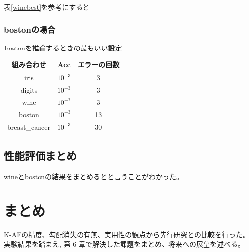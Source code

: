 表\ref{winebest}を参考にすると

\subsubsection{bostonの場合}

\begin{table}[htbp]
    \begin{center}
        \caption{bostonを推論するときの最もいい設定}
        \label{bostonbest}
        \vspace{2mm} 
        \begin{tabular}{ |c|c|c| }
        組み合わせ & Acc & エラーの回数 \\
        \hline
        iris           & $ 10^{-3} $    & 3 \\
        digits         & $ 10^{-3} $    & 3 \\
        wine           & $ 10^{-3} $    & 3 \\
        boston         & $ 10^{-3} $    & 13  \\
        breast\_cancer & $ 10^{-3} $    & 30 \\
        \end{tabular}
    \end{center}
\end{table}




\subsection{性能評価まとめ}
wineとbostonの結果をまとめるとと言うことがわかった。


\section{まとめ}

K-AFの精度、勾配消失の有無、実用性の観点から先行研究との比較を行った。
実験結果を踏まえ, 第 6 章で解決した課題をまとめ、将来への展望を述べる。



